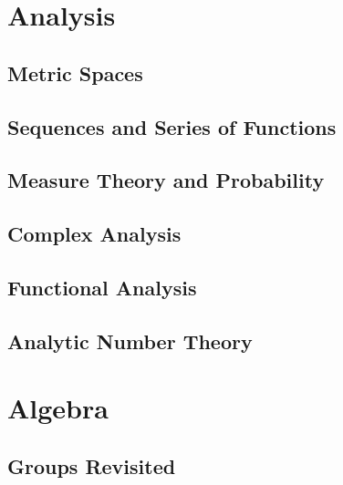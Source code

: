 \documentclass[oneside,openany]{book}
\theoremstyle{definition}
\begin{document}
\part{Analysis}

\chapter{Metric Spaces}


\chapter{Sequences and Series of Functions}


\chapter{Measure Theory and Probability}


\chapter{Complex Analysis}


\chapter{Functional Analysis}


\chapter{Analytic Number Theory}



\part{Algebra}

\chapter{Groups Revisited}

\end{document}
